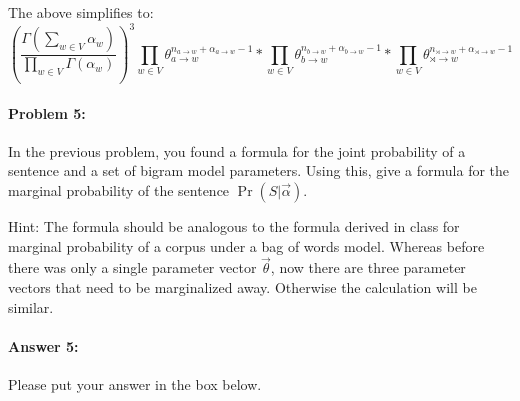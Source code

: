 \documentclass[10pt]{article}
\newenvironment{AnswerBox}{\begin{mdframed}[style=simple]}{\end{mdframed}}
\begin{document}
\begin{AnswerBox}
The above simplifies to:
$$
(\frac{\Gamma(\sum_{w \in V} \alpha_w)}{\prod_{w \in V} \Gamma(\alpha_w)})^3 
\prod _{w \in V} \theta_{a \rightarrow w}^{n_{a \rightarrow w} + \alpha_{a \rightarrow w} -1} *
\prod _{w \in V} \theta_{b \rightarrow w}^{n_{b \rightarrow w} + \alpha_{b \rightarrow w} -1} *
\prod _{w \in V} \theta_{\rtimes \rightarrow w}^{n_{\rtimes \rightarrow w} + \alpha_{\rtimes \rightarrow w} -1}
$$





    
\end{AnswerBox}%


\hrulefill %

\paragraph{Problem 5:}

In the previous problem, you found a formula for the joint probability
of a sentence and a set of bigram model parameters. Using this, give a
formula for the marginal probability of the sentence
$\Pr(S|\vec{\alpha})$.

 Hint: The formula should be analogous to the formula derived
in class for marginal probability of a corpus under a bag of words
model. Whereas before there was only a single parameter vector
$\vec{\theta}$, now there are three parameter vectors that need to be
marginalized away. Otherwise the calculation will be similar.

\paragraph{Answer 5:} Please put your answer in the box below.
\end{document}
